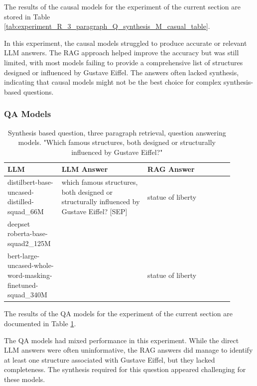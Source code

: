 \documentclass{wseas}
\begin{document}
The results of the causal models for the experiment of the current section
are stored in Table \ref{tab:experiment_R_3_paragraph_Q_synthesis_M_casual_table}.

In this experiment, the causal models struggled to produce accurate or
relevant LLM answers. The RAG approach helped improve the accuracy but
was still limited, with most models failing to provide a comprehensive
list of structures designed or influenced by Gustave Eiffel. The answers
often lacked synthesis, indicating that causal models might not be the
best choice for complex synthesis-based questions.


\subsubsection{QA Models}

\begin{table}[htbp]
  \centering
  \label{tab:experiment_R_3_paragraph_Q_synthesis_M_QaModels_table}  %
  \caption{Synthesis based question, three paragraph retrieval, question answering models. "Which famous structures, both designed or structurally influenced by Gustave Eiffel?"} %
  \begin{tabular}{|p{0.20\linewidth}|p{0.35\linewidth}|p{0.35\linewidth}|}
    \hline
    \textbf{LLM} & \textbf{LLM Answer} & \textbf{RAG Answer} \\
    \hline
    distilbert-base-uncased-distilled-squad\_66M & which famous structures, both designed or structurally influenced by Gustave Eiffel? {[}SEP{]} & statue of liberty \\
    \hline
    deepset roberta-base-squad2\_125M & & \\
    \hline
    bert-large-uncased-whole-word-masking-finetuned-squad\_340M & & statue of liberty \\
    \hline
  \end{tabular}
\end{table}

The results of the QA models for the experiment of the current section
are documented in Table \ref{tab:experiment_R_3_paragraph_Q_synthesis_M_QaModels_table}.

The QA models had mixed performance in this experiment. While the direct
LLM answers were often uninformative, the RAG answers did manage to
identify at least one structure associated with Gustave Eiffel, but they
lacked completeness. The synthesis required for this question appeared
challenging for these models.
\end{document}
